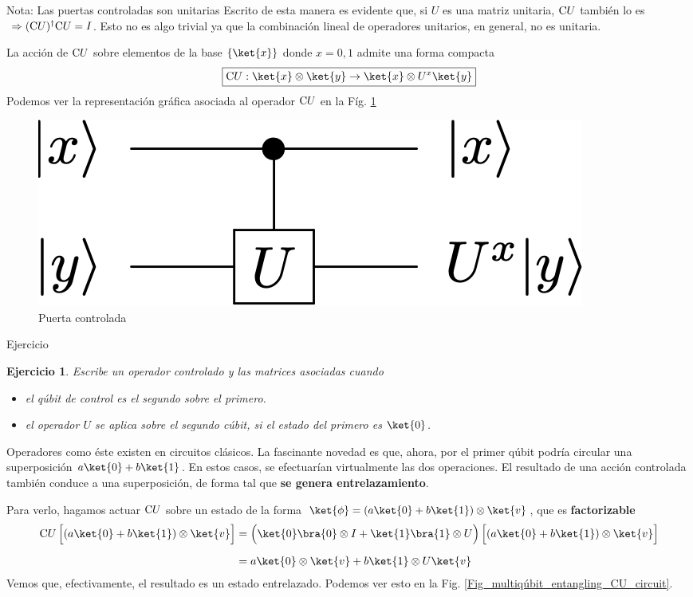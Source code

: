 \documentclass[a4paper,11pt]{book} %
\newtheorem{ejercicio_contador}{Ejercicio}
\newcommand{\Ejercicio}[1]{
		\begin{mybox_gray}{Ejercicio} 
			\begin{ejercicio_contador}
				 #1 
			\end{ejercicio_contador} 
		\end{mybox_gray}
	}
\numberwithin{equation}{chapter}
\def\Lc{\Bigl[}
\def\Rc{\Bigr]}
\newcommand{\cg}[1]{{\rm C}#1}
\begin{document}
	\begin{mybox_blue}{Nota: Las puertas controladas son unitarias}
	Escrito de esta manera es evidente que, si $U$ es una matriz unitaria, $\cg{U}$ también lo es 
	$~\Rightarrow (\cg{U})^\dagger \cg{U} = I$. Esto no es algo trivial ya que la combinación lineal de operadores 
	unitarios, en general, no es  unitaria.
	\end{mybox_blue}

La acción de $\cg{U}$ sobre elementos de la base $\{\ket{x}\}$ donde $x=0,1$ admite una forma compacta 
	\begin{equation}
	\boxed{\cg{U}:\ket{x}\otimes\ket{y}  \rightarrow \ket{x} \otimes U^x\ket{y}}
	\end{equation}
Podemos ver la representación gráfica asociada al operador $\cg{U}$ en la Fíg. \ref{Fig_multiqubit_cU_gate}

	\begin{figure}[H]
	\centering 
	\includegraphics[width=0.25\linewidth]{Figuras/Fig_multiqubit_cU_gate}
	\caption{Puerta controlada}
	\label{Fig_multiqubit_cU_gate}
	\end{figure}
	
	\Ejercicio{
	Escribe un operador controlado y las matrices asociadas cuando  
	\begin{itemize}
		\item el qúbit de control es el segundo sobre el primero.
		\item el operador $U$ se aplica sobre el segundo cúbit, si el estado del primero es $\ket{0}$. 
	\end{itemize}
	}



Operadores como éste existen en circuitos clásicos. La fascinante novedad es que, ahora, por el primer qúbit podría circular una superposición $a\ket{0} + b\ket{1}$. En estos casos, se efectuarían virtualmente las dos operaciones. El resultado de una acción controlada también conduce a una superposición, de forma tal que \textbf{se genera entrelazamiento}. 

Para verlo, hagamos actuar $\cg{U}$ sobre un estado de la forma  $\ket{\phi} = (a\ket{0} + b\ket{1})\otimes \ket{v}$, que es \textbf{factorizable}
	\begin{align*}
	\cg{U}\,\Lc (a\ket{0} +b \ket{1})\otimes \ket{v} \Rc
	& = \left(\ket{0}\bra{0}\otimes I + \ket{1}\bra{1}\otimes U\rule{0mm}{4mm}\right) \Lc (a\ket{0} +b \ket{1})\otimes \ket{v} \Rc \\ \rule{0mm}{5mm} 
    & = a\ket{0}\otimes \ket{v} + b\ket{1}\otimes U\ket{v}
	\end{align*}
Vemos que, efectivamente, el resultado es un estado entrelazado. Podemos ver esto en la Fig. \ref{Fig_multiqúbit_entangling_CU_circuit}.
\end{document}
